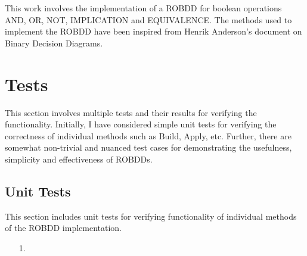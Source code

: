 \documentclass[a4paper, titlepage, 12pt]{article}
\numberwithin{equation}{section}
\begin{document}
        This work involves the implementation of a ROBDD for boolean operations AND, OR, NOT, IMPLICATION and EQUIVALENCE.
        The methods used to implement the ROBDD have been inspired from Henrik Anderson's document on Binary Decision Diagrams.

    \section{Tests}

        This section involves multiple tests and their results for verifying the functionality.
        Initially, I have considered simple unit tests for verifying the correctness of individual methods such as Build, Apply, etc. 
        Further, there are somewhat non-trivial and nuanced test cases for demonstrating the usefulness, simplicity and effectiveness of ROBDDs.

        \subsection{Unit Tests}

            This section includes unit tests for verifying functionality of individual methods of the ROBDD implementation.

            \begin{itemize}
                \item[1.] 
                                        
            \end{itemize}
\end{document}
